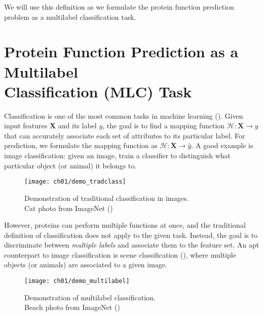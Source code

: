 \par We will use this definition as we formulate the protein function
prediction problem as a multilabel classification task.


\section[Protein Function Prediction as a Multilabel Classification Task]
{Protein Function Prediction as a Multilabel\\Classification  (MLC) Task}
\label{MultilabelClassification}

\par Classification is one of the most common tasks in machine learning
(\cite{herrera2016multilabel}). Given input features $\mathbf{X}$ and its
label $y$, the goal is to find a mapping function $\mathcal{H}: \mathbf{X}
\rightarrow y$ that can accurately associate each set of attributes to its
particular label. For prediction, we formulate the mapping function as
$\mathcal{H}: \mathbf{X} \rightarrow \widehat{y}$. A good example is image
classification: given an image, train a classifier to distinguish what
particular object (or animal) it belongs to.

\begin{figure}[!h]
  \centering
  \texttt{[image: ch01/demo\_tradclass]}
  \caption[Demonstration of traditional classification in images]
  {Demonstration of traditional classification in images.\\Cat photo
  from ImageNet (\cite{russakovsky2015imagenet})}
  \label{demo:traditional}
\end{figure}

\par However, proteins can perform multiple functions at once, and the
traditional definition of classification does not apply to the given task.
Instead, the goal is to discriminate between \textit{multiple labels} and
associate them to the feature set. An apt counterpart to image classification
is scene classification (\cite{boutell2004learning}), where multiple objects
(or animals) are associated to a given image.

\begin{figure}[!h]
  \centering
  \texttt{[image: ch01/demo\_multilabel]}
  \caption[Demonstration of multilabel classification]
  {Demonstration of multilabel classification.\\Beach photo
  from ImageNet (\cite{russakovsky2015imagenet})}
  \label{demo:multilabel}
\end{figure}


